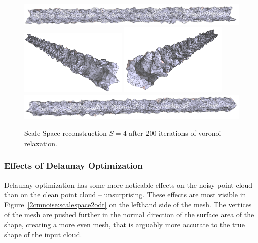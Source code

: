 \documentclass[12pt]{drexelthesis}
\let\Oldsubsubsection\subsubsection
\renewcommand{\subsubsection}{\FloatBarrier\Oldsubsubsection}
\begin{document}
\begin{figure}[!ht]
	\centering
		\includegraphics[width=5in]{simulated-lab-scan/2cmnoise/optimizedNeat/scalespace4lloyd00.png}
		\includegraphics[width=2in]{simulated-lab-scan/2cmnoise/optimizedNeat/scalespace4lloyd01.png}
		\includegraphics[width=2in]{simulated-lab-scan/2cmnoise/optimizedNeat/scalespace4lloyd02.png}
		\includegraphics[width=5in]{simulated-lab-scan/2cmnoise/optimizedNeat/scalespace4lloyd03.png}
		\caption[Scale-Space reconstruction $S = 4$ after 200 iterations of voronoi relaxation]{\centering Scale-Space reconstruction $S = 4$ after 200 iterations of voronoi relaxation.}
	\label{2cmnoise:scalespace4lloyd}
\end{figure}



\subsubsection{Effects of Delaunay Optimization}

Delaunay optimization has some more noticable effects on the noisy point cloud than on the clean point cloud -- unsurprising. These effects are most visible in Figure~\ref{2cmnoise:scalespace2odt} on the lefthand side of the mesh. The vertices of the mesh are pushed further in the normal direction of the surface area of the shape, creating a more even mesh, that is arguably more accurate to the true shape of the input cloud.
\end{document}

